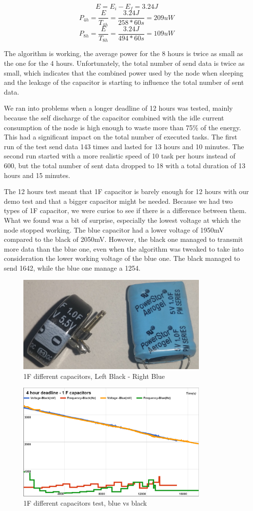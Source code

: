 $$E = E_i - E_f = 3.24J$$
$$P_{4h} = \frac{E}{T_{4h}} = \frac{3.24J}{258 * 60s} = 209uW $$
$$P_{8h} = \frac{E}{T_{8h}} = \frac{3.24J}{494 * 60s} = 109uW $$

The algorithm is working, the average power for the 8 hours is twice as small as the one for the 4
hours. Unfortunately, the total number of send data is twice as small, which indicates that the
combined power used by the node when sleeping and the leakage of the capacitor is starting to
influence the total number of sent data.

We ran into problems when a longer deadline of 12 hours was tested, mainly because the self
discharge of the capacitor combined with the idle current
consumption of the node is high enough to waste more than 75\% of the energy. This had a significant
impact on the total number of executed tasks. The first run of the test send data 143 times and
lasted for 13 hours and 10 minutes. The second run started with a more realistic speed of 10 task
per hours instead of 600, but the total number of sent data dropped to 18 with a total duration of
13 hours and 15 minutes.

The 12 hours test meant that 1F capacitor is barely enough for 12 hours with our demo test and that
a bigger capacitor might be needed. Because we had two types of 1F capacitor, we were curios to
see if there is a difference between them. What we found was a bit of surprise, especially the
lowest voltage at which the node stopped working. The blue capacitor had a lower voltage of 1950mV
compared to the black of 2050mV. However, the black one managed to transmit more data than
the blue one, even when the algorithm was tweaked to take into consideration the lower working
voltage of the blue one. The black managed to send 1642, while the blue one manage a 1254.

\begin{figure}[ht] \centering
\includegraphics[width=0.85\textwidth]{img/capacitors.jpg}
\caption{1F different capacitors, Left Black - Right Blue}
\end{figure}

\begin{figure}[ht] \centering
\includegraphics[width=0.85\textwidth]{img/captest1.png}
\caption{1F different capacitors test, blue vs black}
\end{figure}


